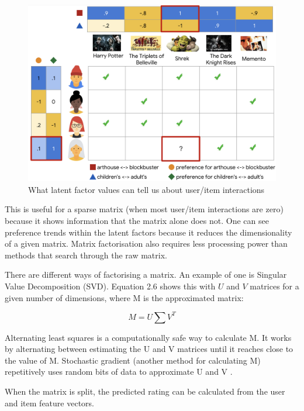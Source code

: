 \begin{figure}[H]
	\includegraphics[scale=0.45]{images/latent_factors}
	\centering
	\caption{What latent factor values can tell us about user/item interactions \citep{httpsdevelopersgooglecom_matrix_2023}} 
	\label{fig:figure}
\end{figure}

This is useful for a sparse matrix (when most user/item interactions are zero) because it shows information that the matrix alone does not. One can see preference trends within the latent factors because it reduces the dimensionality of a given matrix. Matrix factorisation also requires less processing power than methods that search through the raw matrix. 

There are different ways of factorising a matrix. An example of one is Singular Value Decomposition (SVD). Equation 2.6 shows this with $U$ and $V$ matrices for a given number of dimensions,  where M is the approximated matrix:

\begin{equation}
	M = U \sum V ^{T}
\end{equation}

Alternating least squares is a computationally safe way to calculate M. It works by alternating between estimating the U and V matrices until it reaches close to the value of M. Stochastic gradient (another method for calculating M) repetitively uses random bits of data to approximate U and V \citep{koren_matrix_2009}. 

When the matrix is split, the predicted rating can be calculated from the user and item feature vectors. 


